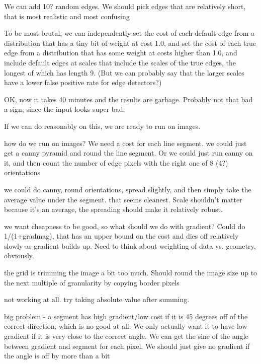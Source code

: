 \documentclass{book}
\begin{document}
\begin{itemize}
\begin{itemize}
      We can add 10? random edges. We should pick edges that are
      relatively short, that is most realistic and most confusing

      To be most brutal, we can independently set the cost of each
      default edge from a distribution that has a tiny bit of weight
      at cost 1.0, and set the cost of each true edge from a
      distribution that has some weight at costs higher than 1.0, and
      include default edges at scales that include the scales of the
      true edges, the longest of which has length 9. (But we can
      probably say that the larger scales have a lower false positive
      rate for edge detectors?)

      OK, now it takes 40 minutes and the results are
      garbage. Probably not that bad a sign, since the input looks
      super bad.

      If we can do reasonably on this, we are ready to run on images.

      how do we run on images? We need a cost for each line
      segment. we could just get a canny pyramid and round the line
      segment. Or we could just run canny on it, and then count the
      number of edge pixels with the right one of 8 (4?) orientations

      we could do canny, round orientations, spread slightly, and then
      simply take the average value under the segment. that seems
      cleanest. Scale shouldn't matter because it's an average, the
      spreading should make it relatively robust.

      we want cheapness to be good, so what should we do with
      gradient? Could do 1/(1+gradmag), that has an upper bound on the
      cost and dies off relatively slowly as gradient builds up. Need
      to think about weighting of data vs. geometry, obviously. 

      the grid is trimming the image a bit too much. Should round the
      image size up to the next multiple of granularity by copying
      border pixels

      not working at all. try taking absolute value after summing.

      big problem - a segment has high gradient/low cost if it is 45
      degrees off of the correct direction, which is no good at
      all. We only actually want it to have low gradient if it is very
      close to the correct angle. We can get the sine of the angle
      between gradient and segment for each pixel. We should just give
      no gradient if the angle is off by more than a bit


\end{itemize}
\end{itemize}
\end{document}
